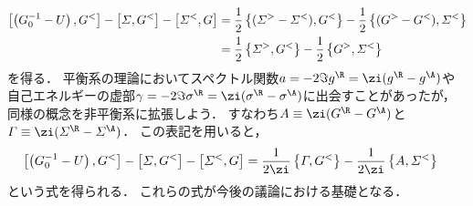 \documentclass[a4paper,10pt]{jsarticle}
\begin{document}
\begin{align}
\left[ \left( G_0^{-1} - U \right), G^{<} \right]
	- \left[ \varSigma, G^{<} \right]
	- \left[ \varSigma^{<}, G \right]
	& = \frac{1}{2} \left\{ ( \varSigma^{>} - \varSigma^{<} ), G^{<} \right\}
		- \frac{1}{2} \left\{ ( G^{>} - G^{<} ), \varSigma^{<} \right\}
\notag \\
	& = \frac{1}{2} \left\{ \varSigma^{>}, G^{<} \right\}
		- \frac{1}{2} \left\{ G^{>}, \varSigma^{<} \right\}
\label{eq:KB_formalism}
\end{align}
を得る．
平衡系の理論においてスペクトル関数$a = - 2 \Im g^{\R} = \zi ( g^{\R} - g^{\A} )$や自己エネルギーの虚部$\gamma = - 2 \Im \sigma^{\R} = \zi (\sigma^{\R} - \sigma^{\A})$に出会すことがあったが，同様の概念を非平衡系に拡張しよう．
すなわち$A \equiv \zi (G^{\R} - G^{\A})$と$\varGamma \equiv \zi (\varSigma^{\R} - \varSigma^{\A})$．
この表記を用いると，
\begin{align*}
\left[ \left( G_0^{-1} - U \right), G^{<} \right]
	- \left[ \varSigma, G^{<} \right]
	- \left[ \varSigma^{<}, G \right]
	& = \frac{1}{2\zi} \left\{ \varGamma, G^{<} \right\}
		- \frac{1}{2\zi} \left\{ A, \varSigma^{<} \right\}
\end{align*}
という式を得られる．
これらの式が今後の議論における基礎となる．
\end{document}
